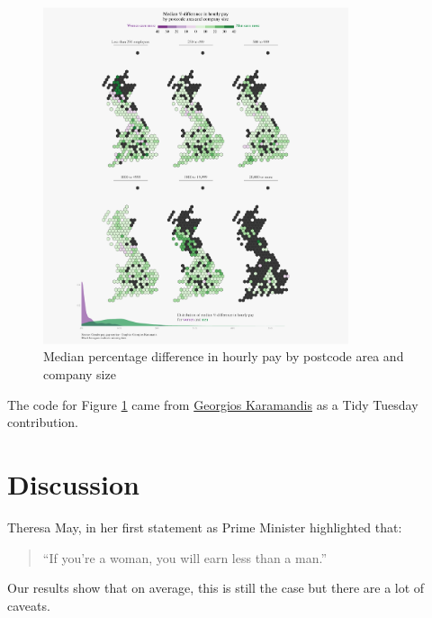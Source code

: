\documentclass[
  11pt,
]{article}
\begin{document}
\begin{figure}[p]

{\centering \includegraphics[width=0.8\textwidth,height=\textheight]{gender_pay_gap_files/figure-pdf/geomaps-1.pdf}

}

\caption{\label{fig:makefigure} Median percentage difference in hourly
pay by postcode area and company size}

\end{figure}

The code for Figure \ref{fig:makefigure} came from
\href{https://github.com/gkaramanis/tidytuesday/tree/master/2022/2022-week_26}{Georgios
Karamandis} as a Tidy Tuesday contribution.

\newpage

\hypertarget{discussion}{%
\section{Discussion}\label{discussion}}

Theresa May, in her first statement as Prime Minister highlighted that:

\begin{quote}
``If you're a woman, you will earn less than a man.''
\end{quote}

Our results show that on average, this is still the case but there are a
lot of caveats.
\end{document}
